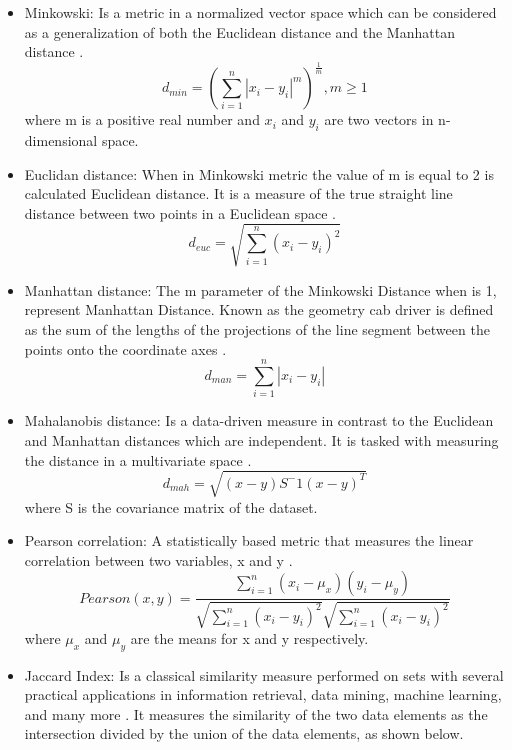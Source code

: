 \begin{itemize}
  \item Minkowski: Is a metric in a normalized vector space which can be considered as a generalization of both the Euclidean distance and the Manhattan distance \citep{R:gan-ma-wu:2007}.
    \begin{equation}
        d_{min} = (\sum_{i=1}^{n}|x_i - y_i|^m)^\frac{1}{m}, m\geq 1
    \end{equation}
    where m is a positive real number and $x_i$ and $y_i$ are two vectors in n-dimensional space.
    \item Euclidan distance: When in Minkowski metric the value of m is equal to 2 is calculated Euclidean distance. It is a measure of the true straight line distance between two points in a Euclidean space \citep{R:jain-murty-flynn:1999}.
    \begin{equation}
        d_{euc} =  \sqrt{\sum_{i=1}^{n}(x_{i}-y_{i})^2}
    \end{equation}
     \item Manhattan distance: The m parameter of the Minkowski Distance when is 1, represent Manhattan Distance. Known as the geometry cab driver is defined as the sum of the lengths of the projections of the line segment between the points onto the coordinate axes \citep{R:rui-donald:2005}.
     \begin{equation}
        d_{man} =  \sum_{i=1}^{n}|x_{i}-y_{i}|
    \end{equation}
    \item Mahalanobis distance: Is a data-driven measure in contrast to the Euclidean and Manhattan distances which are independent. It is tasked with measuring the distance in a multivariate space \citep{R:rui-donald:2005}.
    \begin{equation}
        d_{mah}= \sqrt{(x-y)S^-1(x-y)^T}
    \end{equation}
    where S is the covariance matrix of the dataset.
    \item Pearson correlation: A statistically based metric that measures the linear correlation between two variables, x and y \citep{R:institute:2015}.
    \begin{equation}
        Pearson(x,y)= \frac{\sum_{i=1}^n(x_i-\mu_x)(y_i-\mu_y)}{\sqrt{\sum_{i=1}^n(x_i-y_i)^2}\sqrt{\sum_{i=1}^n(x_i-y_i)^2}}
    \end{equation}
    where $\mu_x$ and $\mu_y$ are the means for x and y respectively.
    \item Jaccard Index: Is a classical similarity measure performed on sets with several practical applications in information retrieval, data mining, machine learning, and many more \citep{R:sven:2016} \citep{R:jasmine-nittin-madhura:2016}. It measures the similarity of the two data elements as the intersection divided by the union of the data elements, as shown below.

\end{itemize}

